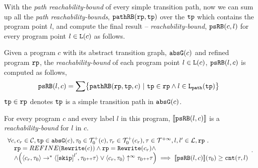 With the \emph{path reachability-bound} of every simple transition path, now we can sum up all the \emph{path reachability-bounds}, $\mathtt{pathRB}(\mathtt{rp}, \mathtt{tp})$ over the $\mathtt{tp}$ which contains the program point $l$, and compute the final result -- \emph{reachability-bound}, $\mathtt{psRB}(c, l)$ for every program point $l \in \mathtt{L}(c)$ as follows.
%
\begin{defn}
\label{def:point_psrb}
Given a program $c$ with its {abstract transition graph}, $\mathtt{abs}{\mathtt{G}}(c)$ and refined program $\mathtt{rp}$,
the \emph{reachability-bound} of each program point $l \in \mathtt{L}(c)$, $\mathtt{psRB}(l, c)$ is computed as follows,
\[ 
 \psRB(l, c) = 
 \sum
 \left\{ \inoutB(\rprog, \tpath, c) ~\vert~ \tpath \in \rprog \land 
 l \in \pathl(\tpath) \right\}
\]
$\mathtt{tp} \in \mathtt{rp}$ denotes $\mathtt{tp}$ is a simple transition path in $\mathtt{abs}{\mathtt{G}}(c)$.
\end{defn}
\begin{thm}[Soundness]
\label{thm:pathsensitive_rb_soundness}
For every program ${c}$ and every label $l$ in this program,
$\llbracket \mathtt{psRB}(l, c) \rrbracket$ is a \emph{reachability-bound} for $l$ in $c$.
%
{\small
\[
 \begin{array}{l}
 \forall c, c_r \in \cdom, \tpath \in \absG(c), \trace_0 \in \ftdom_0(c), \trace_r \in \ftdom_0(c_r), \trace \in \tdom, l, l' \in \ldom, \rprog \st 
 \\ \quad
 \rprog = REFINE(\algrewrite(c))
 \land 
 \rprog = \algrewrite(c_r)
 \land
 \\ \quad
 \land
 \Big(
 \config{c_r, \trace_0} \rightarrow^* \config{\clabel{\eskip}^{l'}, \trace_0 \tracecat \trace}
 \lor \config{c_r, \trace_0} \uparrow^{\infty} \trace_0 \tracecat \trace 
 \Big)
 \implies \econfig{\psRB(l, c)}(\trace_0) \geq \counter(\trace, l)
 \end{array}.
\]
}
\end{thm}